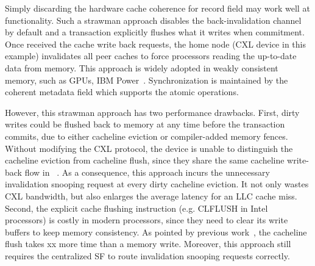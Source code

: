 \ifx\undefined\stale
Simply discarding the hardware cache coherence for record field may work well at functionality. Such a strawman approach disables the back-invalidation channel by default and a transaction explicitly flushes what it writes when commitment. 
Once received the cache write back requests, the home node (CXL device in this example) invalidates all peer caches to force processors reading the up-to-date data from memory. 
This approach is widely adopted in weakly consistent memory, such as GPUs, IBM Power~\cite{rvweak_pact17, rvweak_isca18, spandex_asplos18, lrcgpu_micro16}. 
Synchronization is maintained by the coherent metadata field which supports the atomic operations. 



However, this strawman approach has two performance drawbacks. 
First, dirty writes could be flushed back to memory at any time before the transaction commits, due to either cacheline eviction or compiler-added memory fences. 
Without modifying the CXL protocol, the device is unable to distinguish the cacheline eviction from cacheline flush, since they share the same cacheline write-back flow in \cxlmem~\cite{intel_cxl_pub, cxl-paper, cxl-doc}. 
As a consequence, this approach incurs the unnecessary invalidation snooping request at every dirty cacheline eviction. It not only wastes CXL bandwidth, but also enlarges the average latency for an LLC cache miss.
Second, the explicit cache flushing instruction (e.g. CLFLUSH in Intel~\cite{intel-doc} processors) is costly in modern processors, since they need to clear its write buffers to keep memory consistency. As pointed by previous work~\cite{dynamicamo_isca23}, the cacheline flush takes xx more time than a memory write. 
Moreover, this approach still requires the centralized SF to route invalidation snooping requests correctly. 



